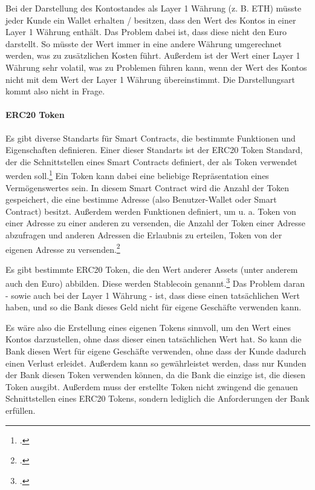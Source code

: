 \documentclass[12pt, a4paper]{article}
\begin{document}
{\noindent
Bei der Darstellung des Kontostandes als Layer 1 Währung (z. B. ETH) müsste jeder Kunde ein Wallet erhalten / besitzen, dass den Wert des Kontos in einer Layer 1 Währung enthält.
Das Problem dabei ist, dass diese nicht den Euro darstellt. 
So müsste der Wert immer in eine andere Währung umgerechnet werden, was zu zusätzlichen Kosten führt. Außerdem ist der Wert einer Layer 1 Währung sehr volatil, was zu Problemen führen kann, wenn der Wert des Kontos nicht mit dem Wert der Layer 1 Währung übereinstimmt.
Die Darstellungsart kommt also nicht in Frage.

\paragraph{ERC20 Token}
Es gibt diverse Standarts für Smart Contracts, die bestimmte Funktionen und Eigenschaften definieren.
Einer dieser Standarts ist der ERC20 Token Standard, der die Schnittstellen eines Smart Contracts definiert, der als Token verwendet werden soll.\footcite[Vgl. hierzu und zum Folgenden][]{w7}
Ein Token kann dabei eine beliebige Repräsentation eines Vermögenswertes sein.
In diesem Smart Contract wird die Anzahl der Token gespeichert, die eine bestimme Adresse (also Benutzer-Wallet oder Smart Contract) besitzt.
Außerdem werden Funktionen definiert, um u. a. Token von einer Adresse zu einer anderen zu versenden, die Anzahl der Token einer Adresse abzufragen und anderen Adressen die Erlaubnis zu erteilen, Token von der eigenen Adresse zu versenden.\footcites[Vgl.][]{w8}[]{w7}

\bigbreak
\noindent
Es gibt bestimmte ERC20 Token, die den Wert anderer Assets (unter anderem auch den Euro) abbilden. Diese werden Stablecoin genannt.\footcite[Vgl. hierzu und weiterführend][4]{q8}
Das Problem daran - sowie auch bei der Layer 1 Währung - ist, dass diese einen tatsächlichen Wert haben, und so die Bank dieses Geld nicht für eigene Geschäfte verwenden kann.

\bigbreak
{}
\label{datenspeicherung:neuer-token}
\noindent
Es wäre also die Erstellung eines eigenen Tokens sinnvoll, um den Wert eines Kontos darzustellen, ohne dass dieser einen tatsächlichen Wert hat. So kann die Bank diesen Wert für eigene Geschäfte verwenden, ohne dass der Kunde dadurch einen Verlust erleidet. 
Außerdem kann so gewährleistet werden, dass nur Kunden der Bank diesen Token verwenden können, da die Bank die einzige ist, die diesen Token ausgibt.
Außerdem muss der erstellte Token nicht zwingend die genauen Schnittstellen eines ERC20 Tokens, sondern lediglich die Anforderungen der Bank erfüllen.
}
\end{document}
